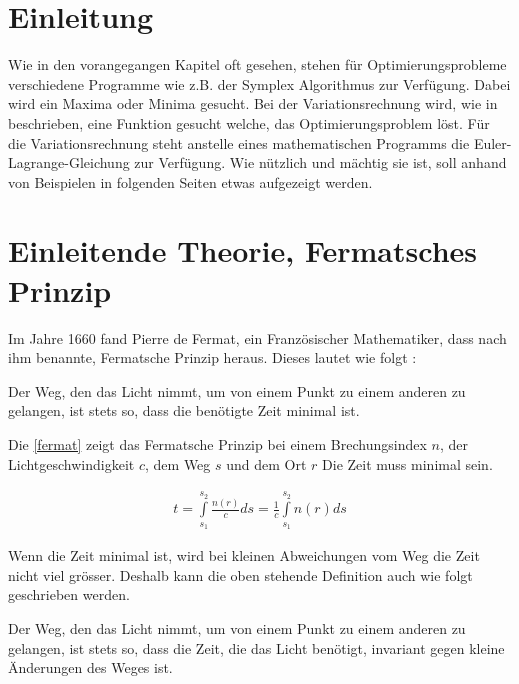 \section{Einleitung}
Wie in den vorangegangen Kapitel oft gesehen, stehen für Optimierungsprobleme verschiedene Programme wie z.B. der Symplex Algorithmus zur Verfügung. Dabei wird ein Maxima oder Minima gesucht. Bei der Variationsrechnung wird, wie in  beschrieben, eine Funktion gesucht welche, das Optimierungsproblem löst. Für die Variationsrechnung steht anstelle eines mathematischen Programms die Euler-Lagrange-Gleichung zur Verfügung. Wie nützlich und mächtig sie ist, soll anhand von Beispielen in folgenden Seiten etwas aufgezeigt werden.

\section{Einleitende Theorie, Fermatsches Prinzip}

Im Jahre 1660 fand Pierre de Fermat, ein Französischer Mathematiker, dass  nach ihm benannte, Fermatsche Prinzip heraus. 
Dieses lautet wie folgt \cite{DefinitionFermat}:

\begin{postulat}
	Der Weg, den das Licht nimmt, 
	um von einem Punkt zu einem anderen zu gelangen, 
	ist stets so, dass die benötigte Zeit minimal ist.
\end{postulat}

Die \eqref{fermat} zeigt das Fermatsche Prinzip bei einem Brechungsindex $n$, 
der Lichtgeschwindigkeit $c$, dem Weg $s$ und dem Ort $r$ Die Zeit muss minimal sein.

\begin{align}
	t= \int\limits_{s_1}^{s_2} \frac{n(r)}{c} ds = \frac{1}{c} \int\limits_{s_1}^{s_2} n(r) ds
	\label{fermat}
\end{align}


Wenn die Zeit minimal ist, wird bei kleinen Abweichungen vom Weg die Zeit nicht viel grösser. 
Deshalb kann die oben stehende Definition auch wie folgt geschrieben werden\cite{Definition}.

\begin{postulat}
Der Weg, den das Licht nimmt,  um von einem Punkt zu einem anderen zu gelangen, 
ist stets so, dass die Zeit, die das Licht benötigt, invariant gegen kleine Änderungen des Weges ist.
\end{postulat}

